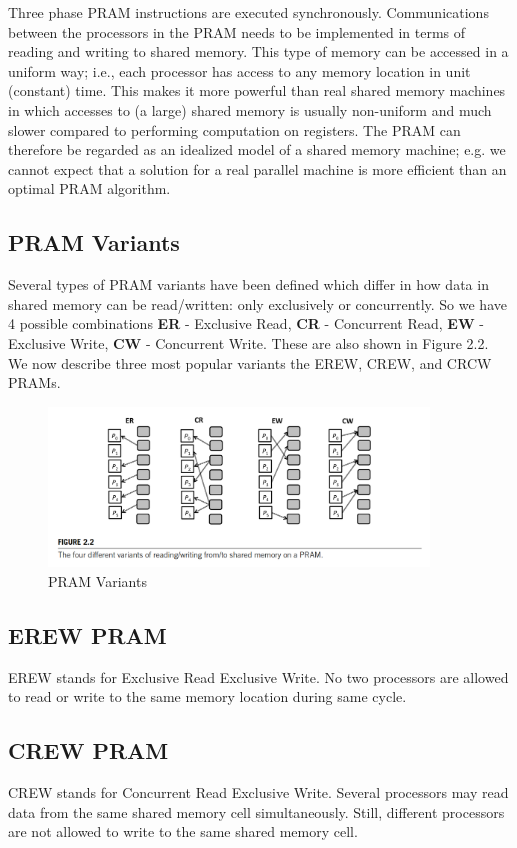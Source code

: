 \documentclass{article}
\begin{document}
Three phase PRAM instructions are executed synchronously. Communications between the processors in the PRAM needs to be implemented in terms of reading and writing to shared memory. This type of memory can be accessed in a uniform way; i.e., each processor has access to any memory location in unit (constant) time. This makes it more powerful than real shared memory machines in which accesses to (a large) shared memory is usually non-uniform and much slower compared to performing computation on registers. The PRAM can therefore be regarded as an idealized model of a shared memory machine; e.g. we cannot expect that a solution for a real parallel machine is more efficient
than an optimal PRAM algorithm.

\subsection*{PRAM Variants}
Several types of PRAM variants have been defined which differ in how data in shared memory can be read/written: only exclusively or concurrently. So we have 4 possible combinations
\textbf{ER} - Exclusive Read, \textbf{CR} - Concurrent Read, \textbf{EW} - Exclusive Write, \textbf{CW} - Concurrent Write. These are also shown in Figure 2.2.
We now describe three most popular variants the EREW, CREW, and CRCW PRAMs.

\begin{figure}[h]
    \centering
    \includegraphics[width=0.9\textwidth]{Images/PRAM2.png}
    \caption{PRAM Variants}
\end{figure}

\subsection*{EREW PRAM}
EREW stands for Exclusive Read Exclusive Write. No two processors are allowed to read or write to the same memory location during same cycle.

\subsection*{CREW PRAM}
CREW stands for Concurrent Read Exclusive Write. Several processors may read data from the same shared memory cell simultaneously. Still, different processors are not allowed to write to the same shared memory cell.
\end{document}
